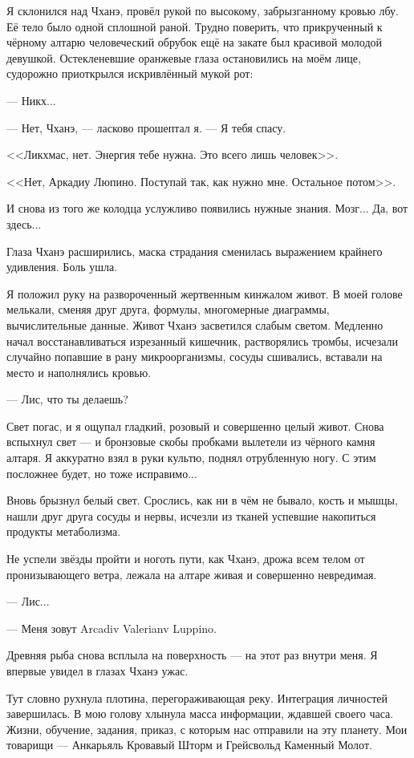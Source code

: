 Я склонился над Чханэ, провёл рукой по высокому, забрызганному кровью лбу.
Её тело было одной сплошной раной.
Трудно поверить, что прикрученный к чёрному алтарю человеческий обрубок ещё на закате был красивой молодой девушкой.
Остекленевшие оранжевые глаза остановились на моём лице, судорожно приоткрылся искривлённый мукой рот:

--- Никх\FM...

--- Нет, Чханэ, --- ласково прошептал я.
--- Я тебя спасу.

<<Ликхмас, нет.
Энергия тебе нужна.
Это всего лишь человек>>.

<<Нет, Аркадиу Люпино.
Поступай так, как нужно мне.
Остальное потом>>.

И снова из того же колодца услужливо появились нужные знания.
Мозг... Да, вот здесь...

Глаза Чханэ расширились, маска страдания сменилась выражением крайнего удивления.
Боль ушла.

Я положил руку на развороченный жертвенным кинжалом живот.
В моей голове мелькали, сменяя друг друга, формулы, многомерные диаграммы, вычислительные данные.
Живот Чханэ засветился слабым светом.
Медленно начал восстанавливаться изрезанный кишечник, растворялись тромбы, исчезали случайно попавшие в рану микроорганизмы, сосуды сшивались, вставали на место и наполнялись кровью.

--- Лис, что ты делаешь?

Свет погас, и я ощупал гладкий, розовый и совершенно целый живот.
Снова вспыхнул свет --- и бронзовые скобы пробками вылетели из чёрного камня алтаря.
Я аккуратно взял в руки культю, поднял отрубленную ногу.
С этим посложнее будет, но тоже исправимо...

Вновь брызнул белый свет.
Срослись, как ни в чём не бывало, кость и мышцы, нашли друг друга сосуды и нервы, исчезли из тканей успевшие накопиться продукты метаболизма.

Не успели звёзды пройти и ноготь пути, как Чханэ, дрожа всем телом от пронизывающего ветра, лежала на алтаре живая и совершенно невредимая.

--- Лис...

--- Меня зовут Arcadiv Valerianv Luppino.

Древняя рыба снова всплыла на поверхность --- на этот раз внутри меня.
Я впервые увидел в глазах Чханэ ужас.

Тут словно рухнула плотина, перегораживающая реку.
Интеграция личностей завершилась.
В мою голову хлынула масса информации, ждавшей своего часа.
Жизни, обучение, задания, приказ, с которым нас отправили на эту планету.
Мои товарищи --- Анкарьяль Кровавый Шторм и Грейсвольд Каменный Молот.


